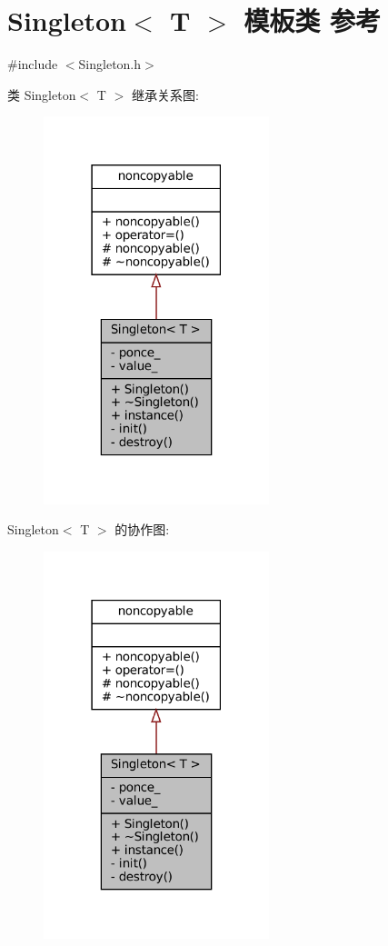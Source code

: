 \hypertarget{classmuduo_1_1Singleton}{}\section{Singleton$<$ T $>$ 模板类 参考}
\label{classmuduo_1_1Singleton}


{\ttfamily \#include $<$Singleton.\+h$>$}



类 Singleton$<$ T $>$ 继承关系图\+:
\nopagebreak
\begin{figure}[H]
\begin{center}
\leavevmode
\includegraphics[width=186pt]{classmuduo_1_1Singleton__inherit__graph}
\end{center}
\end{figure}


Singleton$<$ T $>$ 的协作图\+:
\nopagebreak
\begin{figure}[H]
\begin{center}
\leavevmode
\includegraphics[width=186pt]{classmuduo_1_1Singleton__coll__graph}
\end{center}
\end{figure}

